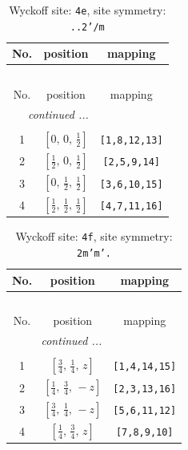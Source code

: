 \documentclass[fleqn,8pt]{jsarticle}
\begin{document}
\begin{longtable}{ccc}
\caption{Wyckoff site: {\tt 4e}, site symmetry: {\tt ..2'/m}}
 \\
 \hline \hline
No. & position & mapping \\ \hline \endfirsthead

\multicolumn{2}{l}{\tablename\ \thetable{}} \\
 \hline \hline
No. & position & mapping \\ \hline \endhead

 \hline \hline
\multicolumn{2}{r}{\footnotesize\it continued ...} \\ \endfoot

 \hline \hline
\multicolumn{2}{r}{} \\ \endlastfoot

1 & $\left[ 0,\, 0,\, \frac{1}{2} \right]$ & {\tt [1,8,12,13]} \\ \hline
2 & $\left[ \frac{1}{2},\, 0,\, \frac{1}{2} \right]$ & {\tt [2,5,9,14]} \\ \hline
3 & $\left[ 0,\, \frac{1}{2},\, \frac{1}{2} \right]$ & {\tt [3,6,10,15]} \\ \hline
4 & $\left[ \frac{1}{2},\, \frac{1}{2},\, \frac{1}{2} \right]$ & {\tt [4,7,11,16]} \\
\end{longtable}
\renewcommand{\arraystretch}{1.2}
\begin{longtable}{ccc}
\caption{Wyckoff site: {\tt 4f}, site symmetry: {\tt 2m'm'.}}
 \\
 \hline \hline
No. & position & mapping \\ \hline \endfirsthead

\multicolumn{2}{l}{\tablename\ \thetable{}} \\
 \hline \hline
No. & position & mapping \\ \hline \endhead

 \hline \hline
\multicolumn{2}{r}{\footnotesize\it continued ...} \\ \endfoot

 \hline \hline
\multicolumn{2}{r}{} \\ \endlastfoot

1 & $\left[ \frac{3}{4},\, \frac{1}{4},\, z \right]$ & {\tt [1,4,14,15]} \\ \hline
2 & $\left[ \frac{1}{4},\, \frac{3}{4},\, - z \right]$ & {\tt [2,3,13,16]} \\ \hline
3 & $\left[ \frac{3}{4},\, \frac{1}{4},\, - z \right]$ & {\tt [5,6,11,12]} \\ \hline
4 & $\left[ \frac{1}{4},\, \frac{3}{4},\, z \right]$ & {\tt [7,8,9,10]} \\
\end{longtable}
\end{document}
